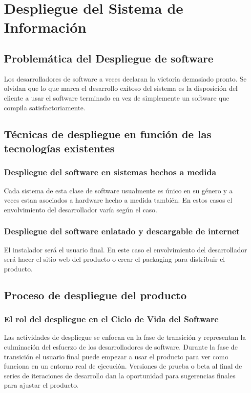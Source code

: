 \section{Despliegue del Sistema de Información}
\subsection{Problemática del Despliegue de software}
Los desarrolladores de software a veces declaran la victoria demasiado pronto. Se olvidan que lo que marca el desarrollo exitoso del sistema es la disposición del cliente a usar el software terminado en vez de simplemente un software que compila satisfactoriamente.
\subsection{Técnicas de despliegue en función de las tecnologías existentes}
\subsubsection{Despliegue del software en sistemas hechos a medida}
Cada sistema de esta clase de software usualmente es único en su género y a veces estan asociados a hardware hecho a medida también. En estos casos el envolvimiento del desarrollador varía según el caso.
\subsubsection{Despliegue del software enlatado y descargable de internet}
El instalador será el usuario final. En este caso el envolvimiento del desarrollador será hacer el sitio web del producto o crear el packaging para distribuir el producto.
\subsection{Proceso de despliegue del producto}
\subsubsection{El rol del despliegue en el Ciclo de Vida del Software}
Las actividades de despliegue se enfocan en la fase de transición y representan la culminación del esfuerzo de los desarrolladores de software. Durante la fase de transición el usuario final puede empezar a usar el producto para ver como funciona en un entorno real de ejecución. Versiones de prueba o beta al final de series de iteraciones de desarrollo dan la oportunidad para sugerencias finales para ajustar el producto.
